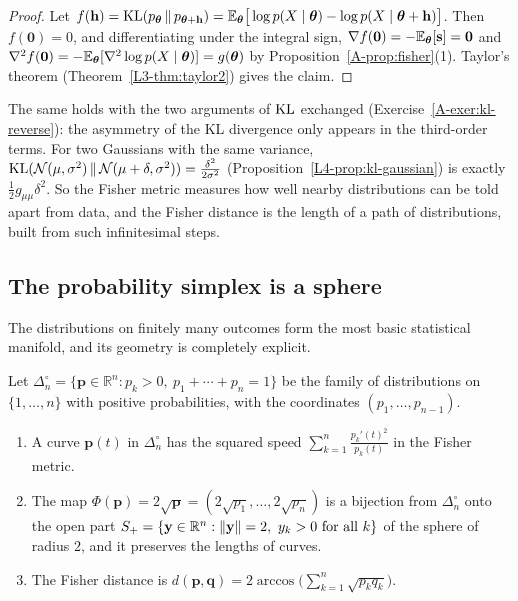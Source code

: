 \begin{proof}
    Let $f(\mathbf{h}) = \operatorname{KL}(p_{\boldsymbol{\theta}} \,\|\, p_{\boldsymbol{\theta} + \mathbf{h}}) = \mathbb{E}_{\boldsymbol{\theta}}\big[\log p(X \mid \boldsymbol{\theta}) - \log p(X \mid \boldsymbol{\theta} + \mathbf{h})\big]$. Then $f(\mathbf{0}) = 0$, and differentiating under the integral sign, $\nabla f(\mathbf{0}) = -\mathbb{E}_{\boldsymbol{\theta}}[\mathbf{s}] = \mathbf{0}$ and $\nabla^2 f(\mathbf{0}) = -\mathbb{E}_{\boldsymbol{\theta}}[\nabla^2\log p(X \mid \boldsymbol{\theta})] = g(\boldsymbol{\theta})$ by Proposition~\ref{A-prop:fisher}(1). Taylor's theorem (Theorem~\ref{L3-thm:taylor2}) gives the claim.
\end{proof}

The same holds with the two arguments of $\operatorname{KL}$ exchanged (Exercise~\ref{A-exer:kl-reverse}): the asymmetry of the KL divergence only appears in the third-order terms. For two Gaussians with the same variance, $\operatorname{KL}(\mathcal{N}(\mu, \sigma^2) \,\|\, \mathcal{N}(\mu + \delta, \sigma^2)) = \frac{\delta^2}{2\sigma^2}$ (Proposition~\ref{L4-prop:kl-gaussian}) is exactly $\frac{1}{2}g_{\mu\mu}\delta^2$. So the Fisher metric measures how well nearby distributions can be told apart from data, and the Fisher distance is the length of a path of distributions, built from such infinitesimal steps.

\subsection{The probability simplex is a sphere}

The distributions on finitely many outcomes form the most basic statistical manifold, and its geometry is completely explicit.

\begin{theorem}\label{A-thm:simplex-sphere}
    Let $\Delta_n^\circ = \{\mathbf{p} \in \mathbb{R}^n : p_k > 0, \ p_1 + \cdots + p_n = 1\}$ be the family of distributions on $\{1, \ldots, n\}$ with positive probabilities, with the coordinates $(p_1, \ldots, p_{n-1})$.
    \begin{enumerate}
        \item A curve $\mathbf{p}(t)$ in $\Delta_n^\circ$ has the squared speed $\sum_{k=1}^n \frac{p_k'(t)^2}{p_k(t)}$ in the Fisher metric.
        \item The map $\Phi(\mathbf{p}) = 2\sqrt{\mathbf{p}} = (2\sqrt{p_1}, \ldots, 2\sqrt{p_n})$ is a bijection from $\Delta_n^\circ$ onto the open part $S_+ = \{\mathbf{y} \in \mathbb{R}^n : \lVert \mathbf{y} \rVert = 2, \ y_k > 0 \text{ for all } k\}$ of the sphere of radius $2$, and it preserves the lengths of curves.
        \item The Fisher distance is $d(\mathbf{p}, \mathbf{q}) = 2\arccos\big(\sum_{k=1}^n \sqrt{p_kq_k}\big)$.
    \end{enumerate}
\end{theorem}

